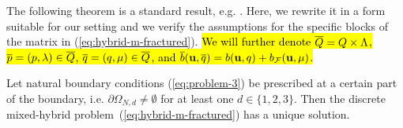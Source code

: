 The following theorem is a standard result, e.g. \cite[Theorem~1.2]%
{Brezzi-1991-MHF}. Here, we rewrite it in a form suitable for our setting and
we verify the assumptions for the specific blocks of the matrix in
(\ref{eq:hybrid-m-fractured}).
\hl{
We will further denote $\overline{Q} = Q\times \Lambda$, 
$\overline{p}=(p,\lambda) \in \overline{Q}$, $\overline{q}=(q, \mu) \in \overline{Q}$, and 
$\overline{b}(\mathbf{u}, \overline{q})=b(\mathbf{u}, q) + b_{\mathcal{F}}(\mathbf{u}, \mu)$. 
}


\begin{theorem}
\label{th:regular} Let natural boundary conditions (\ref{eq:problem-3}) be
prescribed at a certain part of the boundary, i.e. $\partial\Omega_{N,d}
\neq\emptyset$ for at least one $d\in\{1,2,3\}$. Then the discrete
mixed-hybrid problem~(\ref{eq:hybrid-m-fractured})
has a unique solution.
\end{theorem}


